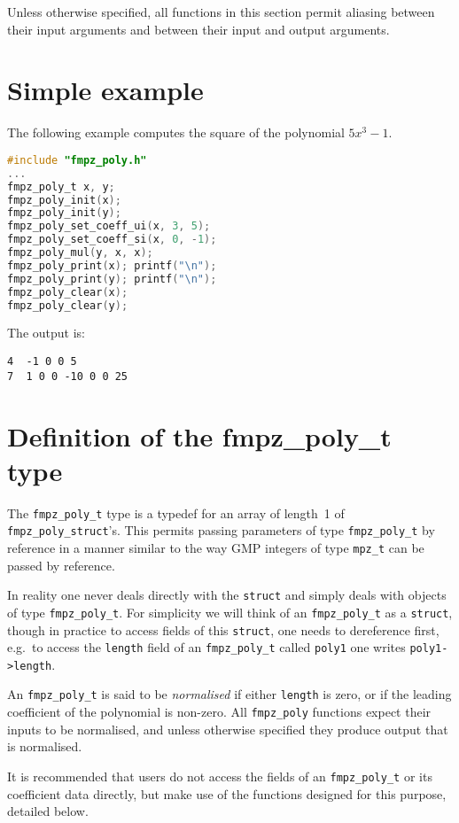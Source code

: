\documentclass[a4paper,10pt]{book}
\newcommand{\code}{\lstinline}
\begin{document}
Unless otherwise specified, all functions in this section permit aliasing 
between their input arguments and between their input and output arguments.

\section{Simple example}

The following example computes the square of the polynomial $5x^3 - 1$.
\begin{lstlisting}[language=c]
#include "fmpz_poly.h"
...
fmpz_poly_t x, y;
fmpz_poly_init(x);
fmpz_poly_init(y);
fmpz_poly_set_coeff_ui(x, 3, 5);
fmpz_poly_set_coeff_si(x, 0, -1);
fmpz_poly_mul(y, x, x);
fmpz_poly_print(x); printf("\n");
fmpz_poly_print(y); printf("\n");
fmpz_poly_clear(x);
fmpz_poly_clear(y);
\end{lstlisting}

The output is:
\begin{lstlisting}
4  -1 0 0 5
7  1 0 0 -10 0 0 25
\end{lstlisting}

\section{Definition of the fmpz\_poly\_t type}

The \code{fmpz_poly_t} type is a typedef for an array of length~1 of 
\code{fmpz_poly_struct}'s.  This permits passing parameters of type 
\code{fmpz_poly_t} by reference in a manner similar to the way GMP integers 
of type \code{mpz_t} can be passed by reference. 

In reality one never deals directly with the \code{struct} and simply deals 
with objects of type \code{fmpz_poly_t}.  For simplicity we will think of an 
\code{fmpz_poly_t} as a \code{struct}, though in practice to access fields 
of this \code{struct}, one needs to dereference first, e.g.\ to access the 
\code{length} field of an \code{fmpz_poly_t} called \code{poly1} one writes 
\code{poly1->length}. 

An \code{fmpz_poly_t} is said to be \emph{normalised} if either 
\code{length} is zero, or if the leading coefficient of the polynomial is 
non-zero.  All \code{fmpz_poly} functions expect their inputs to be 
normalised, and unless otherwise specified they produce output that is 
normalised. 

It is recommended that users do not access the fields of an 
\code{fmpz_poly_t} or its coefficient data directly, but make use of the 
functions designed for this purpose, detailed below.
\end{document}
